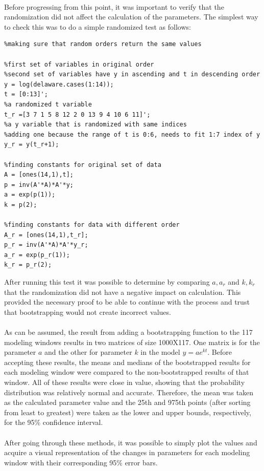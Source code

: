 \documentclass[12pt]{article}
\begin{document}
\paragraph{} Before progressing from this point, it was important to verify that the randomization did not affect the calculation of the parameters. The simplest way to check this was to do a simple randomized test as follows:
\begin{lstlisting}
%making sure that random orders return the same values

%first set of variables in original order
%second set of variables have y in ascending and t in descending order
y = log(delaware.cases(1:14));
t = [0:13]';
%a randomized t variable
t_r =[3 7 1 5 8 12 2 0 13 9 4 10 6 11]';
%a y variable that is randomized with same indices
%adding one because the range of t is 0:6, needs to fit 1:7 index of y
y_r = y(t_r+1);

%finding constants for original set of data
A = [ones(14,1),t];
p = inv(A'*A)*A'*y;
a = exp(p(1));
k = p(2);

%finding constants for data with different order
A_r = [ones(14,1),t_r];
p_r = inv(A'*A)*A'*y_r;
a_r = exp(p_r(1));
k_r = p_r(2);
\end{lstlisting}
After running this test it was possible to determine by comparing $a,a_r$ and $k,k_r$ that the randomization did not have a negative impact on calculation. This provided the necessary proof to be able to continue with the process and trust that bootstrapping would not create incorrect values.
\paragraph{} As can be assumed, the result from adding a bootstrapping function to the 117 modeling windows results in two matrices of size 1000X117. One matrix is for the parameter $a$ and the other for parameter $k$ in the model $y = ae^{kt}$. Before accepting these results, the means and medians of the bootstrapped results for each modeling window were compared to the non-bootstrapped results of that window. All of these results were close in value, showing that the probability distribution was relatively normal and accurate. Therefore, the mean was taken as the calculated parameter value and the 25th and 975th points (after sorting from least to greatest) were taken as the lower and upper bounds, respectively, for the 95\% confidence interval.
\paragraph{} After going through these methods, it was possible to simply plot the values and acquire a visual representation of the changes in parameters for each modeling window with their corresponding 95\% error bars.
\end{document}
